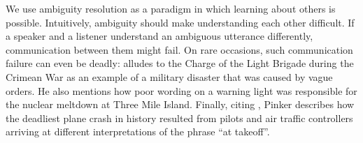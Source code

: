 \documentclass[10pt,a4paper]{article}
\begin{document}


We use ambiguity resolution as a paradigm in which learning about others is possible.
Intuitively, ambiguity should make understanding each other difficult.
If a speaker and a listener understand an ambiguous utterance differently, communication between them might fail.
On rare occasions, such communication failure can even be deadly: 
 alludes to the Charge of the Light Brigade during the Crimean War as an example of a military disaster that was caused by vague orders.
He also mentions how poor wording on a warning light was responsible for the nuclear meltdown at Three Mile Island. Finally, citing , Pinker describes how the deadliest plane crash in history resulted from pilots and air traffic controllers arriving at different interpretations of the phrase ``at takeoff''.
\end{document}
